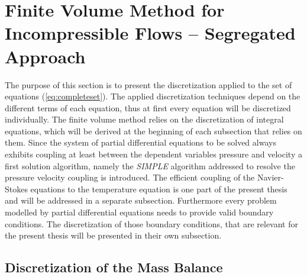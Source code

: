   \section{Finite Volume Method for Incompressible Flows -- Segregated Approach}

  The purpose of this section is to present the discretization applied to the set of equations (\ref{eq:completeset}). The applied discretization techniques depend on the different terms of each equation, thus at first every equation will be discretized individually. The finite volume method relies on the discretization of integral equations, which will be derived at the beginning of each subsection that relies on them. Since the system of partial differential equations to be solved always exhibits coupling at least between the dependent variables pressure and velocity a first solution algorithm, namely the \textit{SIMPLE} algorithm addressed to resolve the pressure velocity coupling is introduced. The efficient coupling of the Navier-Stokes equations to the temperature equation is one part of the present thesis and will be addressed in a separate subsection. Furthermore every problem modelled by partial differential equations needs to provide valid boundary conditions. The discretization of those boundary conditions, that are relevant for the present thesis will be presented in their own subsection.

    \subsection{Discretization of the Mass Balance}


